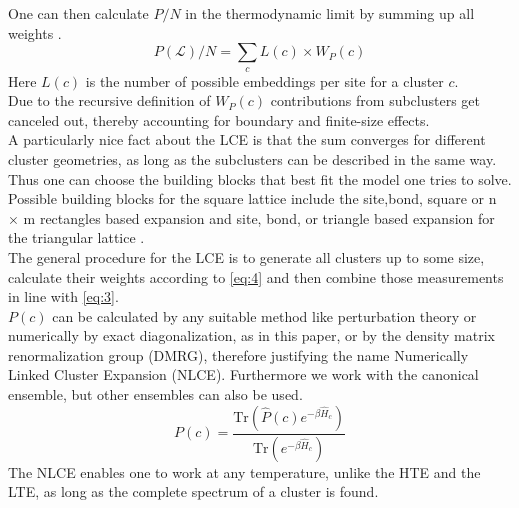 \documentclass{article}
\begin{document}
One can then calculate $P/N$ in the thermodynamic limit by summing up
all weights \cite{Rigol}.
\begin{equation}
\label{eq:3}
P(\mathcal{L})/N = \sum\limits_c L(c) \times W_P(c)
\end{equation}
Here $L(c)$ is the number of possible embeddings per site for a cluster
$c$.\\
Due to the recursive definition of $W_P(c)$ contributions from
subclusters get canceled out, thereby accounting for boundary and finite-size effects.\\
A particularly nice fact about the LCE is that the sum converges for
different cluster geometries, as long as the subclusters can be
described in the same way. Thus one can choose the
building blocks that best fit the model one tries to solve. Possible building blocks for the square
lattice include the site,bond, square or n
$\times$ m rectangles based expansion and site, bond, or triangle
based expansion for the triangular lattice \cite{Rigol,Kallin}.\\
The general procedure for the LCE is to generate all clusters up to
some size, calculate their weights according to \eqref{eq:4} and then combine those
measurements in line with \eqref{eq:3}.\\
$P(c)$ can be calculated by any suitable method like perturbation theory
or numerically by exact diagonalization, as in this paper, or by the
density matrix renormalization group (DMRG), therefore justifying the name Numerically Linked Cluster
Expansion (NLCE). Furthermore we work with the canonical ensemble, but
other ensembles can also be used.\\
\begin{equation}
\label{eq:6}
P(c) = \frac{ \text{Tr} \left(\hat P(c) e^{-\beta \hat H_c} \right)}{ \text{Tr}
  \left(e^{-\beta \hat H_c} \right)}
\end{equation}
The NLCE enables one to work at any temperature, unlike the HTE and
the LTE, as long as the complete spectrum of a cluster is found.
\end{document}
